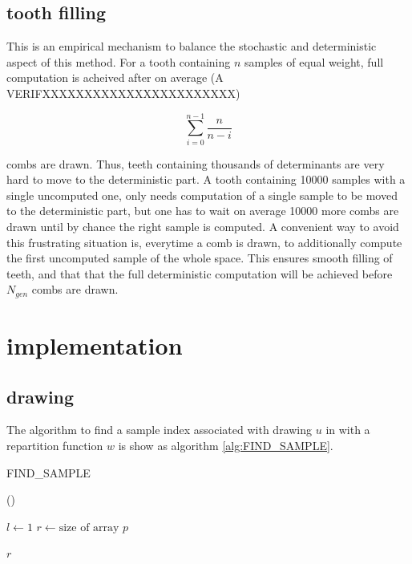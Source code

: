 \documentclass[./thesis.tex]{subfiles}
\begin{document}
\subsection*{tooth filling}

This is an empirical mechanism to balance the stochastic and deterministic aspect of this method. For a tooth containing $n$ samples of equal weight, full computation is acheived after on average (A VERIFXXXXXXXXXXXXXXXXXXXXXXX)

\begin{equation}
\sum_{i=0}^{n-1} \frac{n}{n-i}
\end{equation}

combs are drawn. Thus, teeth containing thousands of determinants are very hard to move to the deterministic part. A tooth containing 10000 samples with a single uncomputed one, only needs computation of a single sample to be moved to the deterministic part, but one has to wait on average 10000 more combs are drawn until by chance the right sample is computed.
A convenient way to avoid this frustrating situation is, everytime a comb is drawn, to additionally compute the first uncomputed sample of the whole space. This ensures smooth filling of teeth, and that that the full deterministic computation will be achieved before $N_{gen}$ combs are drawn.

\section{implementation}



\subsection{drawing}

The algorithm to find a sample index associated with drawing $u$ in with a repartition function $w$ is show as algorithm \ref{alg:FIND_SAMPLE}.

\begin{algorithm}
\label{alg:FIND_SAMPLE}
\caption{FIND\_SAMPLE}
	
	\Fn(){}{
		$l \gets 1$ \;
		$r \gets \text{size of array } p$ \;
		
		\KwRet $r$ \;
	}
\end{algorithm}
\end{document}
